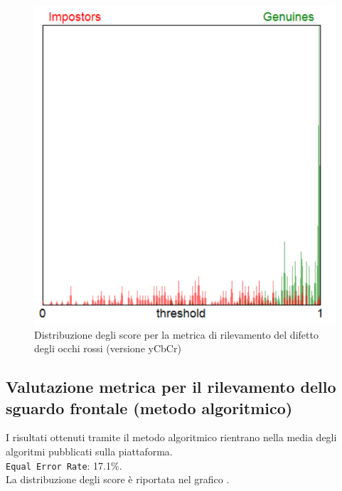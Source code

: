 \documentclass[12pt,a4paper,openright,twoside]{book}
\begin{document}
\begin{figure}
    \centering
    \includegraphics[width=.8\linewidth]{figures/score-distribution-red-eye-with-ycbcr.png}
    \caption{Distribuzione degli score per la metrica di rilevamento del difetto degli occhi rossi (versione yCbCr)}
    \label{fig:score_distribution_red_eye_with_ycbcr}
\end{figure}

\subsection{Valutazione metrica per il rilevamento dello sguardo frontale (metodo algoritmico)}
I risultati ottenuti tramite il metodo algoritmico rientrano nella media degli algoritmi pubblicati sulla piattaforma. \\[4pt]
\texttt{Equal Error Rate}: 17.1\%. \\
La distribuzione degli score è riportata nel grafico .
\end{document}
